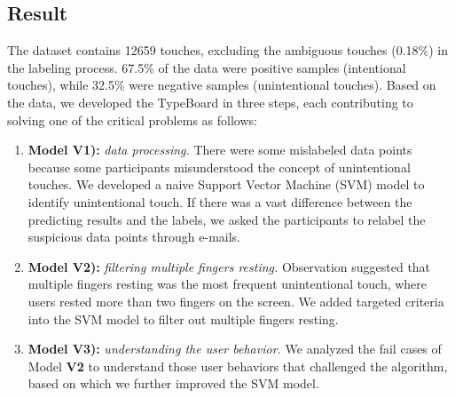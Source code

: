 \subsection{Result}

The dataset contains 12659 touches, excluding the ambiguous touches (0.18\%) in the labeling process. 67.5\% of the data were positive samples (intentional touches), while 32.5\% were negative samples (unintentional touches). Based on the data, we developed the TypeBoard in three steps, each contributing to solving one of the critical problems as follows:

\begin{enumerate}
	\item{\textbf{Model V1):} \emph{data processing.} There were some mislabeled data points because some participants misunderstood the concept of unintentional touches. We developed a naive Support Vector Machine (SVM) model to identify unintentional touch. If there was a vast difference between the predicting results and the labels, we asked the participants to relabel the suspicious data points through e-mails.}
	\item{\textbf{Model V2):} \emph{filtering multiple fingers resting.} Observation suggested that multiple fingers resting was the most frequent unintentional touch, where users rested more than two fingers on the screen. We added targeted criteria into the SVM model to filter out multiple fingers resting.}
	\item{\textbf{Model V3):} \emph{understanding the user behavior.} We analyzed the fail cases of Model \textbf{V2} to understand those user behaviors that challenged the algorithm, based on which we further improved the SVM model.}
\end{enumerate}


